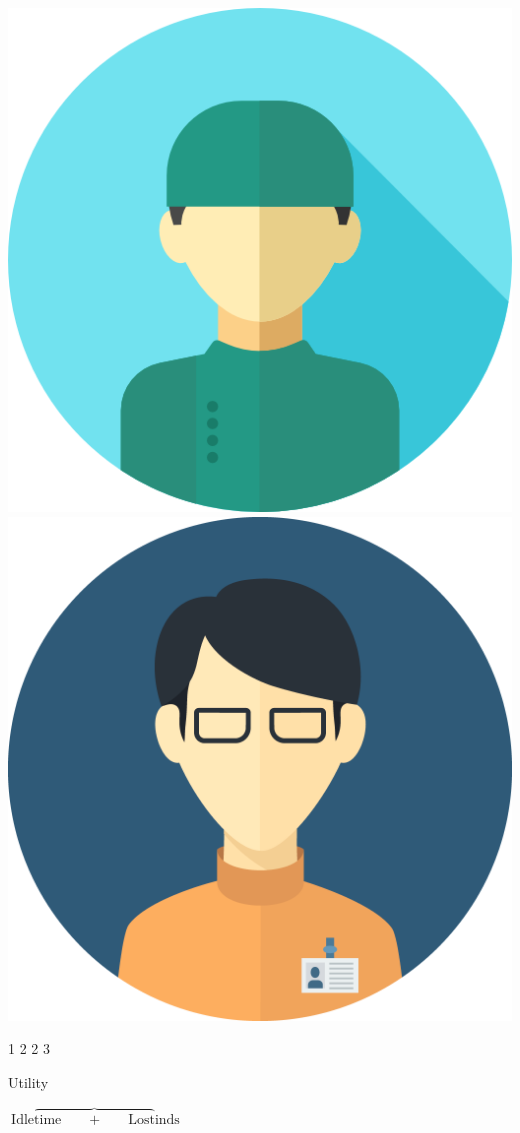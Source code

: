 \begin{frame}
    \hspace{0.4cm}
    \includegraphics[scale=0.1]{Bin/cartoon_pics/doctor_2.png}
    \hspace{0.4cm}
    \includegraphics[scale=0.04]{Bin/cartoon_pics/doctor_3.png}

    \LARGE
    \vspace{0.5cm}
    1 \hspace{1.4cm} 2 \hspace{1.5cm} 2 \hspace{1.5cm} 3

    \vspace{1.5cm}
    Utility

    \small
    \(\text{Idle} \overbrace{\text{time} \qquad + \qquad \text{Lost}} \text{inds}\)
\end{frame}



